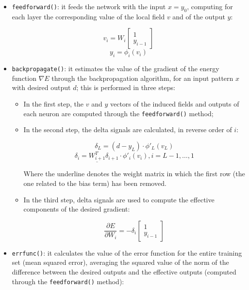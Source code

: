 \documentclass[letterpaper,headings=standardclasses]{scrartcl}
\begin{document}
\begin{itemize}

    \item \texttt{feedforward()}: it feeds the network with the input $x = y_0$, computing for each layer the corresponding value of the local field $v$ and of the output $y$:
    
    $$ v_i = W_i \left[ \begin{matrix} 1 \\ y_{i - 1} \end{matrix} \right] $$
    $$ y_i = \phi_i(v_i) $$
    
    \item \texttt{backpropagate()}: it estimates the value of the gradient of the energy function $\nabla E$ through the backpropagation algorithm, for an input pattern $x$ with desired output $d$; this is performed in three steps:
    
    \begin{itemize}

        \item In the first step, the $v$ and $y$ vectors of the induced fields and outputs of each neuron are computed through the \texttt{feedforward()} method;

        \item In the second step, the delta signals are calculated, in reverse order of $i$:
        
        $$ \delta_L = (d - y_L) \cdot \phi'_L(v_L) $$
        $$ \delta_i = \underline{W_{i + 1}^T} \delta_{i + 1} \cdot \phi'_i(v_i), i = L - 1, \dots, 1 $$

        Where the underline denotes the weight matrix in which the first row (the one related to the bias term) has been removed.

        \item In the third step, delta signals are used to compute the effective components of the desired gradient:
        
        $$ \frac{\partial E}{\partial W_i} = -\delta_i \left[ \begin{matrix} 1 \\ y_{i - 1} \end{matrix} \right] $$

    \end{itemize}
    
    \item \texttt{errfunc()}: it calculates the value of the error function for the entire training set (mean squared error), averaging the squared value of the norm of the difference between the desired outputs and the effective outputs (computed through the \texttt{feedforward()} method):
    

\end{itemize}
\end{document}
